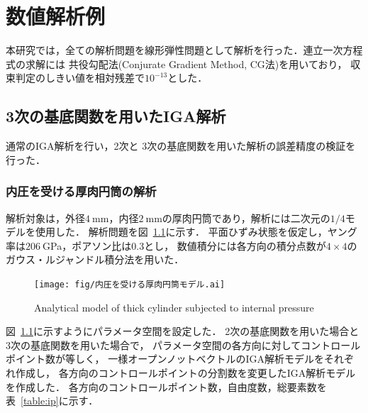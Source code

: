 \chapter{数値解析例}
本研究では，全ての解析問題を線形弾性問題として解析を行った．連立一次方程式の求解には
共役勾配法(Conjurate Gradient Method, CG法)を用いており，
収束判定のしきい値を相対残差で$10^{-13}$とした．

\section{3次の基底関数を用いたIGA解析}
通常のIGA解析を行い，2次と
3次の基底関数を用いた解析の誤差精度の検証を行った．

\subsection{内圧を受ける厚肉円筒の解析}
解析対象は，外径$4\ $mm，内径$2\ $mmの厚肉円筒であり，解析には二次元の$1/4$モデルを使用した．
解析問題を図~\ref{fig:internal pressure}に示す．
平面ひずみ状態を仮定し，ヤング率は$206\ $GPa，ポアソン比は$0.3$とし，
数値積分には各方向の積分点数が$4\times 4$のガウス・ルジャンドル積分法を用いた．

\begin{figure}[htbp]
  \centering
  \texttt{[image: fig/内圧を受ける厚肉円筒モデル.ai]}
  \caption{Analytical model of thick cylinder subjected to internal pressure}
  \label{fig:internal pressure}
\end{figure}

図~\ref{fig:internal pressure}に示すようにパラメータ空間を設定した．
2次の基底関数を用いた場合と3次の基底関数を用いた場合で，
パラメータ空間の各方向に対してコントロールポイント数が等しく，
一様オープンノットベクトルのIGA解析モデルをそれぞれ作成し，
各方向のコントロールポイントの分割数を変更したIGA解析モデルを作成した．
各方向のコントロールポイント数，自由度数，総要素数を表~\ref{table:ip}に示す．

\begin{table}[hbtp]
  \caption{Details of IGA analytical model}
  \label{table:ip}
  \centering
\end{table}

